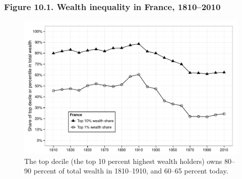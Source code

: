 \documentclass[t]{beamer}\usepackage[]{graphicx}\usepackage[]{color}
\newenvironment{knitrout}{}{} %
\begin{document}
\begin{frame}[label=Figure_10_1]
\frametitle{Figure 10.1. Wealth inequality in France, 1810--2010}
\begin{figure}[t]
\begin{minipage}[b]{\textwidth}
\centering
\begin{knitrout}\footnotesize
{}\color{fgcolor}

{\centering \includegraphics[width=1\linewidth]{figures/bw/Figure_10_1} 

}



\end{knitrout}
\caption{The top decile (the top 10 percent highest wealth holders) owns 80--90 percent of total wealth in 1810--1910, and 60--65 percent today.}
\end{minipage}
\end{figure}
\end{frame}
\end{document}
